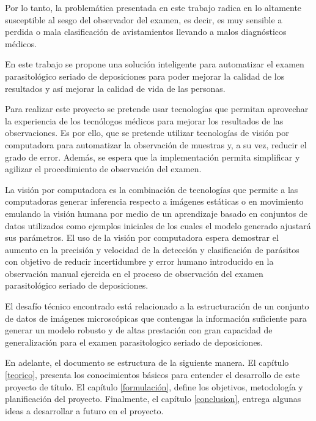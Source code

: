 \documentclass[letter,12pt]{report}
\begin{document}
Por lo tanto, la problemática presentada en este trabajo radica en lo altamente
susceptible al sesgo del observador del examen, es decir, es muy sensible a perdida o
mala clasificación de avistamientos llevando a malos diagnósticos médicos. 

En este trabajo se propone una solución inteligente para automatizar el examen
parasitológico seriado de deposiciones para poder mejorar la calidad de los
resultados y así mejorar la calidad de vida de las personas.

Para realizar este proyecto se pretende usar tecnologías que permitan aprovechar la
experiencia de los tecnólogos médicos para mejorar los resultados de las
observaciones.  Es por ello, que se pretende utilizar tecnologías de visión por
computadora para automatizar la observación de muestras y, a su vez, reducir el grado
de error. Además, se espera que la implementación permita simplificar y agilizar el
procedimiento de observación del examen.

La visión por computadora es la combinación de tecnologías que permite a las
computadoras generar inferencia respecto a imágenes estáticas o en movimiento
emulando la visión humana por medio de un aprendizaje basado en conjuntos de datos
utilizados como ejemplos iniciales de los cuales el modelo generado ajustará sus
parámetros.  El uso de la visión por computadora espera demostrar el aumento en la
precisión y velocidad de la detección y clasificación de parásitos con objetivo de
reducir incertidumbre y error humano introducido en la observación manual ejercida en
el proceso de observación del examen parasitológico seriado de deposiciones. 

El desafío técnico encontrado está relacionado a la estructuración de un conjunto de
datos de imágenes microscópicas que contengas la información suficiente para generar
un modelo robusto y de altas prestación con gran capacidad de generalización para el
examen parasitologico seriado de deposiciones.

En adelante, el documento se estructura de la siguiente manera. El capítulo
\ref{teorico}, presenta los conocimientos básicos para entender el desarrollo de este
proyecto de título. El capítulo \ref{formulación}, define los objetivos, metodología
y planificación del proyecto. Finalmente, el capítulo \ref{conclusion}, entrega
algunas ideas a desarrollar a futuro en el proyecto.
\end{document}
